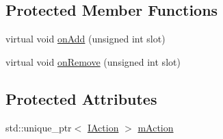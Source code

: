 \subsection*{Protected Member Functions}
\begin{DoxyCompactItemize}
\item 
virtual void \hyperlink{classmaudio_1_1ActionNode_ad2a0d41f2370fa8a32fc4e6ce2bb9eef}{on\-Add} (unsigned int slot)
\item 
virtual void \hyperlink{classmaudio_1_1ActionNode_aaa27a57824ba5e990d935ef117b6ef69}{on\-Remove} (unsigned int slot)
\end{DoxyCompactItemize}
\subsection*{Protected Attributes}
\begin{DoxyCompactItemize}
\item 
std\-::unique\-\_\-ptr$<$ \hyperlink{classmaudio_1_1IAction}{I\-Action} $>$ \hyperlink{classmaudio_1_1ActionNode_adac01f86f3fe16240528288f52729bc6}{m\-Action}
\end{DoxyCompactItemize}


